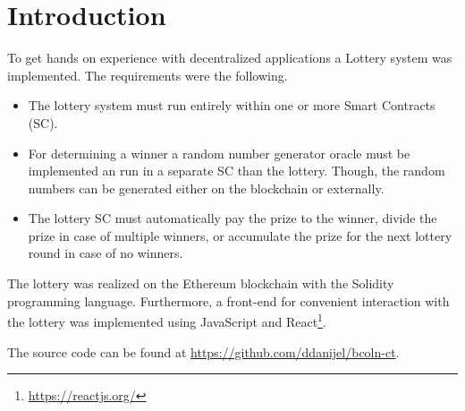 \chapter{Introduction}

To get hands on experience with decentralized applications a Lottery system was
implemented. The requirements were the following.
\begin{itemize}
    \item The lottery system must run entirely within one or more Smart
    Contracts (SC).
    \item For determining a winner a random number generator oracle must be
    implemented an run in a separate SC than the lottery. Though, the random
    numbers can be generated either on the blockchain or externally.
    \item The lottery SC must automatically pay the prize to the winner, divide
    the prize in case of multiple winners, or accumulate the prize for the next
    lottery round in case of no winners. 
\end{itemize}

The lottery was realized on the Ethereum blockchain with the Solidity
programming language. Furthermore, a front-end for convenient interaction with
the lottery was implemented using JavaScript and React\footnote{\url{https://reactjs.org/}}. 

The source code can be found at \url{https://github.com/ddanijel/bcoln-ct}.
